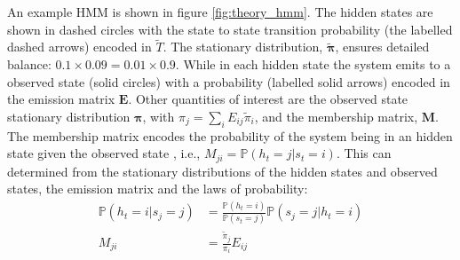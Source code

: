 An example HMM is shown in figure \ref{fig:theory_hmm}. The hidden states are shown in dashed circles with the state to state transition probability (the labelled dashed arrows) encoded in $\widetilde{T}$. The stationary distribution, $\widetilde{\bm{\pi}}$,  ensures detailed balance: $0.1\times 0.09 = 0.01\times 0.9$. While in each hidden state the system emits to a observed state (solid circles) with a probability (labelled solid arrows) encoded in the emission matrix $\mathbf{E}$. Other quantities of interest are the observed state stationary distribution $\bm{\pi}$, with $\pi_{j} = \sum_{i}E_{ij}\widetilde{\pi}_{i}$, and the membership matrix, $\mathbf{M}$. The membership matrix encodes the probability of the system being in an hidden state given the observed state \cite{noeProjectedHiddenMarkov2013a}, i.e., $M_{ji}=\mathbb{P}(h_t=j|s_t=i)$. This can determined from the stationary distributions of the hidden states and observed states, the emission matrix and the laws of probability: 
\begin{align}
    \mathbb{P}(h_t=i|s_j=j) &= \frac{\mathbb{P}(h_t=i)}{\mathbb{P}(s_t=j)}\mathbb{P}(s_j=j|h_t=i) \\
    M_{ji} &= \frac{\widetilde{\pi}_j}{\pi_i}E_{ij}
\end{align}

